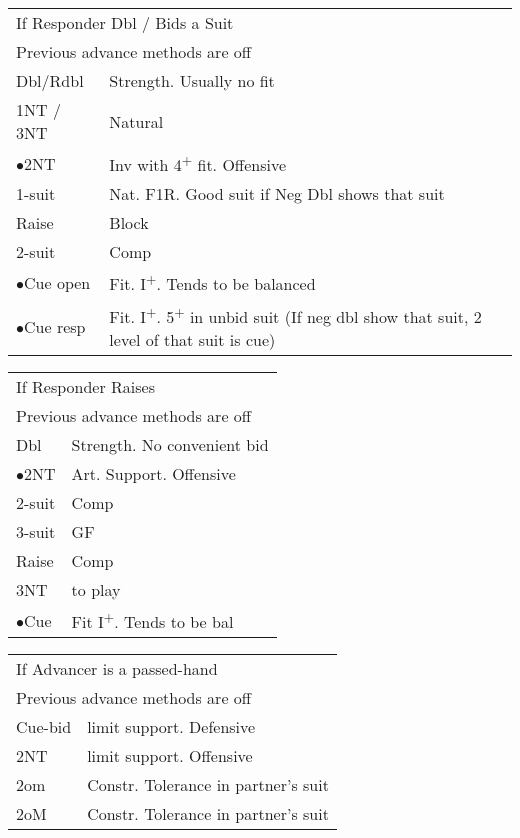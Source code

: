 \documentclass{article}
\newcommand{\nt}{\relsize{-1}NT\relsize{1}}
\newcommand{\up}{\textsuperscript{+}}
\newcommand{\al}{$\bullet$}
\begin{document}
\medskip

\begin{tabular}{|l|p{6.5cm}}
	\multicolumn{2}{l}{If Responder Dbl / Bids a Suit} \\
	\multicolumn{2}{l}{Previous advance methods are off} \\
	Dbl/Rdbl & Strength. Usually no fit \\
	1\nt{} / 3\nt{} & Natural \\
	\al{}2\nt{} & Inv with 4\up{} fit. Offensive \\
	1-suit & Nat. F1R. Good suit if Neg Dbl shows that suit \\
	Raise & Block \\
	2-suit & Comp \\
	\al{}Cue open & Fit. I\up{}. Tends to be balanced \\
	\al{}Cue resp & Fit. I\up{}. 5\up{} in unbid suit (If neg dbl show that suit, 2 level of that suit is cue) \\
\end{tabular}

\medskip

\begin{tabular}{|l|p{6.5cm}}
	\multicolumn{2}{l}{If Responder Raises} \\
	\multicolumn{2}{l}{Previous advance methods are off} \\
	Dbl & Strength. No convenient bid \\
	\al{}2\nt{} & Art. Support. Offensive \\
	2-suit & Comp \\
	3-suit & GF \\
	Raise & Comp \\
	3\nt{} & to play \\
	\al{}Cue & Fit I\up{}. Tends to be bal \\
\end{tabular}

\medskip

\begin{tabular}{|l|p{6.5cm}}
	\multicolumn{2}{l}{If Advancer is a passed-hand} \\
	\multicolumn{2}{l}{Previous advance methods are off} \\
	Cue-bid & limit support. Defensive \\
	2\nt{} & limit support. Offensive \\
	2om & Constr. Tolerance in partner's suit \\
	2oM & Constr. Tolerance in partner's suit
\end{tabular}
\end{document}
